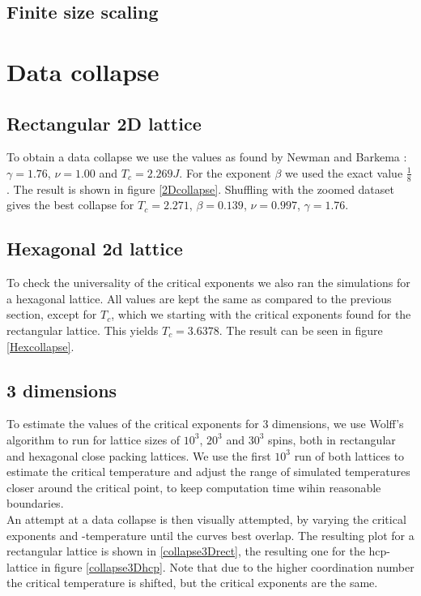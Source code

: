 \documentclass[11pt,twocolumn]{article}
\begin{document}
\subsection{Finite size scaling}
\section{Data collapse}
\subsection{Rectangular 2D lattice}
To obtain a data collapse we use the values as found by Newman and Barkema \cite{Thebook}: $\gamma = 1.76$, $\nu = 1.00$ and $T_c=2.269J$. For the exponent $\beta$ we used the exact value $\frac18$. The result is shown in figure \ref{2Dcollapse}. Shuffling with the zoomed dataset gives the best collapse for $T_c = 2.271$, $\beta =0.139$, $\nu =0.997$, $\gamma =1.76$.
\subsection{Hexagonal 2d lattice}
To check the universality of the critical exponents we also ran the simulations for a hexagonal lattice. All values are kept the same as compared to the previous section, except for $T_c$, which we starting with the critical exponents found for the rectangular lattice. This yields $T_c=3.6378$. The result can be seen in figure \ref{Hexcollapse}.
\subsection{3 dimensions}
To estimate the values of the critical exponents for 3 dimensions, we use Wolff's algorithm to run for lattice sizes of $10^3$, $20^3$ and $30^3$ spins, both in rectangular and hexagonal close packing lattices. We use the first $10^3$ run of both lattices to estimate the critical temperature and adjust the range of simulated temperatures closer around the critical point, to keep computation time wihin reasonable boundaries.\\
An attempt at a data collapse is then visually attempted, by varying the critical exponents and -temperature until the curves best overlap. The resulting plot for a rectangular lattice is shown in \ref{collapse3Drect}, the resulting one for the hcp-lattice in figure \ref{collapse3Dhcp}. Note that due to the higher coordination number the critical temperature is shifted, but the critical exponents are the same.
{}

\end{document}

